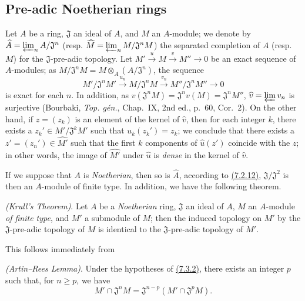 \subsection{Pre-adic Noetherian rings}
\label{subsection-pre-adic-noetherian-rings}

\begin{env}[7.3.1]
\label{0.7.3.1}
Let $A$ be a ring, $\mathfrak{J}$ an ideal of $A$, and $M$ an $A$-module; we denote by
$\widehat{A}=\varprojlim_n A/\mathfrak{J}^n$
(resp. $\widehat{M}=\varprojlim_n M/\mathfrak{J}^n M$) the separated completion of $A$
(resp. $M$) for the $\mathfrak{J}$-pre-adic topology. Let
$M'\xrightarrow{u}M\xrightarrow{v}M''\to 0$ be an exact sequence of $A$-modules; as
$M/\mathfrak{J}^n M=M\otimes_A(A/\mathfrak{J}^n)$, the sequence
\[
  M'/\mathfrak{J}^n M'\xrightarrow{u_n}M/\mathfrak{J}^n M
  \xrightarrow{v_n}M''/\mathfrak{J}^n M''\longrightarrow 0
\]
is exact for each $n$. In addition, as
$v(\mathfrak{J}^n M)=\mathfrak{J}^n v(M)=\mathfrak{J}^n M''$,
$\widehat{v}=\varprojlim v_n$ is surjective (Bourbaki, {\em Top. g\'en.}, Chap.~IX,
2nd ed., p.~60, Cor.~2). On the other hand, if $z=(z_k)$ is an element of the kernel of
$\widehat{v}$, then for each integer $k$, there exists a $z_k'\in M'/\mathfrak{J}^k M'$
such that $u_k(z_k')=z_k$; we conclude that there exists  a $z'=(z_n')\in\widehat{M'}$
such that the first $k$ components of $\widehat{u}(z')$ coincide with the $z$; in other
words, the image of $\widehat{M'}$ under $\widehat{u}$ is {\em dense} in the kernel of
$\widehat{v}$.

If we suppose that $A$ is {\em Noetherian}, then so is $\widehat{A}$, according to
\hyperref[0.7.2.12]{(7.2.12)}, $\mathfrak{J}/\mathfrak{J}^2$ is then an $A$-module of
finite type. In addition, we have the following theorem.
\end{env}

\begin{thm}[7.3.2]
\label{0.7.3.2}
{\em (Krull's Theorem)}. Let $A$ be a {\em Noetherian} ring, $\mathfrak{J}$ an ideal of
$A$, $M$ an $A$-module {\em of finite type}, and $M'$ a submodule of $M$; then the induced
topology on $M'$ by the $\mathfrak{J}$-pre-adic topology of $M$ is identical to the
$\mathfrak{J}$-pre-adic topology of $M'$.
\end{thm}

This follows immediately from
\begin{lem}[7.3.2.1]
\label{0.7.3.2.1}
{\em (Artin--Rees Lemma)}. Under the hypotheses of \hyperref[0.7.3.2]{(7.3.2)}, there
exists an integer $p$ such that, for $n\geqslant p$, we have
\[
  M'\cap\mathfrak{J}^n M=\mathfrak{J}^{n-p}(M'\cap\mathfrak{J}^p M).
\]
\end{lem}

